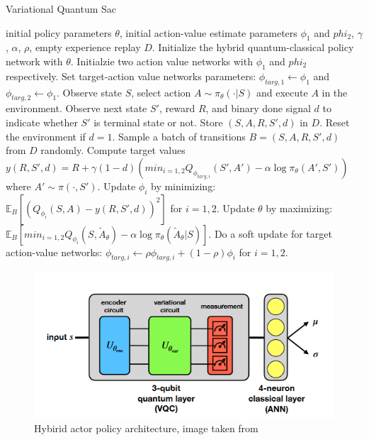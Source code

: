 \begin{algorithm} \label{qsac}
	\caption{Variational Quantum Sac}
	\begin{algorithmic}
		\REQUIRE initial policy parameters $\theta$, initial action-value estimate parameters $\phi_1$ and $phi_2$, $\gamma$, $\alpha$, $\rho$, empty experience replay $D$.
		\STATE Initialize the hybrid quantum-classical policy network with $\theta$.
		\STATE Initialzie two action value networks with $\phi_1$ and $phi_2$ respectively.
		\STATE Set target-action value networks parameters: $\phi_{targ, 1} \leftarrow \phi_1$ and $\phi_{targ, 2} \leftarrow \phi_1$.
		\STATE Observe state $S$, select action $A \sim \pi_{\theta}(\cdot |S)$ and execute $A$ in the environment.
		\STATE Observe next state $S'$, reward $R$, and binary done signal $d$ to indicate whether $S'$ is terminal state or not.
		\STATE Store $(S,A,R,S',d)$ in $D$.
		\STATE Reset the environment if $d=1$.
		\STATE Sample a batch of transitions $B = {(S,A,R,S',d)}$ from $D$ randomly.
		\STATE Compute target values $y(R,S',d) = R + \gamma (1-d) (min_{i=1,2}Q_{\phi_{targ,i}} (S',A') - \alpha \log \pi_{\theta}(A',S'))$ where $A' \sim \pi(\cdot,S')$.
		\STATE Update $\phi_i$ by minimizing: $\mathbb{E}_B [(Q_{\phi_i}(S,A) - y(R,S',d))^2]$ for $i = 1,2$.
		\STATE Update $\theta$ by maximizing: $\mathbb{E}_B [min_{i=1,2} Q_{\phi_i}(S,\tilde{A}_\theta) - \alpha \log \pi_{\theta}(\tilde{A}_\theta|S)]$.
		\STATE Do a soft update for target action-value networks: $\phi_{targ,i} \leftarrow \rho \phi_{targ,i} + (1-\rho)\phi_i$ for $i=1,2$.
		\ENDFOR
	\end{algorithmic}
\end{algorithm}
\begin{figure}[H]
	\centering
	\includegraphics[width=\linewidth]{img/qsac}
	\caption{Hybirid actor policy architecture, image taken from \cite{https://doi.org/10.48550/arxiv.2112.11921}}
	\label{fig:qsac}
\end{figure}
